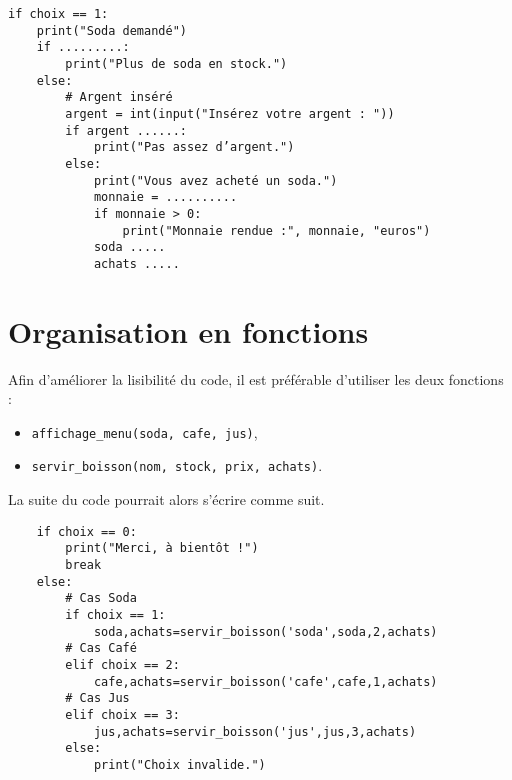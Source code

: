 \begin{verbatim}
if choix == 1:
    print("Soda demandé")
    if .........:
        print("Plus de soda en stock.")
    else:
        # Argent inséré
        argent = int(input("Insérez votre argent : "))
        if argent ......:
            print("Pas assez d’argent.")
        else:
            print("Vous avez acheté un soda.")
            monnaie = ..........
            if monnaie > 0:
                print("Monnaie rendue :", monnaie, "euros")
            soda .....
            achats .....
\end{verbatim}




\section{Organisation en fonctions}

Afin d'améliorer la lisibilité du code, il est préférable d'utiliser les deux fonctions :
\begin{itemize}
    \item \texttt{affichage\_menu(soda, cafe, jus)},
    \item \texttt{servir\_boisson(nom, stock, prix, achats)}.
\end{itemize}

La suite du code pourrait alors s'écrire comme suit.
\begin{verbatim}
    if choix == 0:
        print("Merci, à bientôt !")
        break
    else:
        # Cas Soda
        if choix == 1:
            soda,achats=servir_boisson('soda',soda,2,achats)
        # Cas Café
        elif choix == 2:
            cafe,achats=servir_boisson('cafe',cafe,1,achats)
        # Cas Jus
        elif choix == 3:
            jus,achats=servir_boisson('jus',jus,3,achats)
        else:
            print("Choix invalide.")
\end{verbatim}


